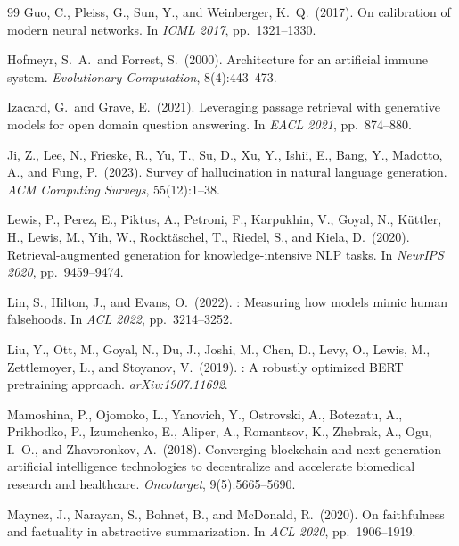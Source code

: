 \documentclass[11pt,a4paper]{article}
\begin{document}
\begin{thebibliography}{99}
Guo, C., Pleiss, G., Sun, Y., and Weinberger, K.~Q.\ (2017).
\newblock On calibration of modern neural networks.
\newblock In \textit{ICML 2017}, pp.\ 1321--1330.

Hofmeyr, S.~A.\ and Forrest, S.\ (2000).
\newblock Architecture for an artificial immune system.
\newblock \textit{Evolutionary Computation}, 8(4):443--473.

Izacard, G.\ and Grave, E.\ (2021).
\newblock Leveraging passage retrieval with generative models for open domain
  question answering.
\newblock In \textit{EACL 2021}, pp.\ 874--880.

Ji, Z., Lee, N., Frieske, R., Yu, T., Su, D., Xu, Y., Ishii, E., Bang, Y.,
  Madotto, A., and Fung, P.\ (2023).
\newblock Survey of hallucination in natural language generation.
\newblock \textit{ACM Computing Surveys}, 55(12):1--38.

Lewis, P., Perez, E., Piktus, A., Petroni, F., Karpukhin, V., Goyal, N.,
  K\"{u}ttler, H., Lewis, M., Yih, W., Rockt\"{a}schel, T., Riedel, S., and
  Kiela, D.\ (2020).
\newblock Retrieval-augmented generation for knowledge-intensive {NLP} tasks.
\newblock In \textit{NeurIPS 2020}, pp.\ 9459--9474.

Lin, S., Hilton, J., and Evans, O.\ (2022).
: Measuring how models mimic human falsehoods.
\newblock In \textit{ACL 2022}, pp.\ 3214--3252.

Liu, Y., Ott, M., Goyal, N., Du, J., Joshi, M., Chen, D., Levy, O., Lewis,
  M., Zettlemoyer, L., and Stoyanov, V.\ (2019).
: A robustly optimized {BERT} pretraining approach.
\newblock \textit{arXiv:1907.11692}.

Mamoshina, P., Ojomoko, L., Yanovich, Y., Ostrovski, A., Botezatu, A., Prikhodko,
  P., Izumchenko, E., Aliper, A., Romantsov, K., Zhebrak, A., Ogu, I.~O., and
  Zhavoronkov, A.\ (2018).
\newblock Converging blockchain and next-generation artificial intelligence
  technologies to decentralize and accelerate biomedical research and
  healthcare.
\newblock \textit{Oncotarget}, 9(5):5665--5690.

Maynez, J., Narayan, S., Bohnet, B., and McDonald, R.\ (2020).
\newblock On faithfulness and factuality in abstractive summarization.
\newblock In \textit{ACL 2020}, pp.\ 1906--1919.


\end{thebibliography}
\end{document}
